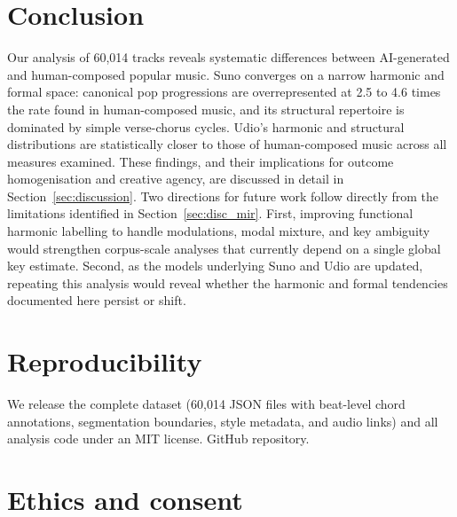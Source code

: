 \documentclass{article}
\begin{document}
\section{Conclusion}
\label{sec:conclusion}

Our analysis of 60,014 tracks reveals systematic differences between AI-generated and human-composed popular music. Suno converges on a narrow harmonic and formal space: canonical pop progressions are overrepresented at 2.5 to 4.6 times the rate found in human-composed music, and its structural repertoire is dominated by simple verse-chorus cycles. Udio's harmonic and structural distributions are statistically closer to those of human-composed music across all measures examined. These findings, and their implications for outcome homogenisation and creative agency, are discussed in detail in Section~\ref{sec:discussion}.
Two directions for future work follow directly from the limitations identified in Section~\ref{sec:disc_mir}. First, improving functional harmonic labelling to handle modulations, modal mixture, and key ambiguity would strengthen corpus-scale analyses that currently depend on a single global key estimate. Second, as the models underlying Suno and Udio are updated, repeating this analysis would reveal whether the harmonic and formal tendencies documented here persist or shift.

\section{Reproducibility}
\label{sec:reproducibility}
We release the complete dataset (60,014 JSON files with beat-level chord annotations, segmentation boundaries, style metadata, and audio links) and all analysis code under an MIT license. GitHub repository.

\section{Ethics and consent}
\end{document}
